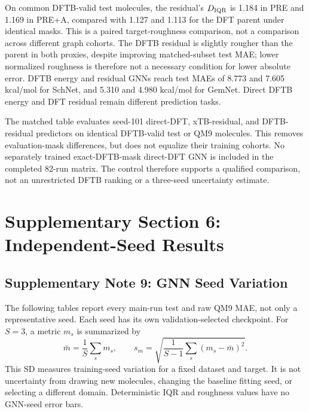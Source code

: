 On common DFTB-valid test molecules, the residual's \(D_{\rm IQR}\) is 1.184 in PRE and 1.169 in PRE+A, compared with 1.127 and 1.113 for the DFT parent under identical masks. This is a paired target-roughness comparison, not a comparison across different graph cohorts. The DFTB residual is slightly rougher than the parent in both proxies, despite improving matched-subset test MAE; lower normalized roughness is therefore not a necessary condition for lower absolute error. DFTB energy and residual GNNs reach test MAEs of 8.773 and 7.605 kcal/mol for SchNet, and 5.310 and 4.980 kcal/mol for GemNet. Direct DFTB energy and DFT residual remain different prediction tasks.

The matched table evaluates seed-101 direct-DFT, xTB-residual, and DFTB-residual predictors on identical DFTB-valid test or QM9 molecules. This removes evaluation-mask differences, but does not equalize their training cohorts. No separately trained exact-DFTB-mask direct-DFT GNN is included in the completed 82-run matrix. The control therefore supports a qualified comparison, not an unrestricted DFTB ranking or a three-seed uncertainty estimate.

\clearpage
\section*{Supplementary Section 6: Independent-Seed Results}
\subsection*{Supplementary Note 9: GNN Seed Variation}
The following tables report every main-run test and raw QM9 MAE, not only a representative seed. Each seed has its own validation-selected checkpoint. For \(S=3\), a metric \(m_s\) is summarized by
\begin{equation}
 \bar m=\frac{1}{S}\sum_s m_s,\qquad
 s_m=\sqrt{\frac{1}{S-1}\sum_s(m_s-\bar m)^2}.
\end{equation}
This SD measures training-seed variation for a fixed dataset and target. It is not uncertainty from drawing new molecules, changing the baseline fitting seed, or selecting a different domain. Deterministic IQR and roughness values have no GNN-seed error bars.

